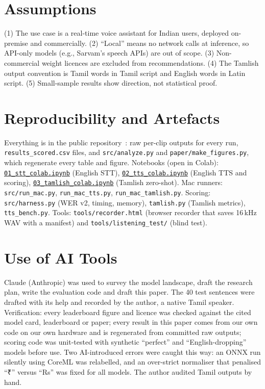\documentclass[conference]{IEEEtran}
\newcommand{\rupee}{{\tamilfont ₹}}
\newcommand{\colab}[1]{\href{https://colab.research.google.com/github/Kiranrossi/local-voice-research/blob/main/notebooks/#1}{\nolinkurl{#1}}}
\begin{document}
\section{Assumptions}
\label{sec:assumptions}
(1) The use case is a real-time voice assistant for Indian users, deployed on-premise and commercially. (2) ``Local'' means no network calls at inference, so API-only models (e.g., Sarvam's speech APIs) are out of scope. (3) Non-commercial weight licences are excluded from recommendations. (4) The Tamlish output convention is Tamil words in Tamil script and English words in Latin script. (5) Small-sample results show direction, not statistical proof.

\section{Reproducibility and Artefacts}
Everything is in the public repository~\cite{repo}: raw per-clip outputs for every run, \texttt{results\_scored.csv} files, and \texttt{src/analyze.py} and \texttt{paper/make\_figures.py}, which regenerate every table and figure. Notebooks (open in Colab): \colab{01_stt_colab.ipynb} (English STT), \colab{02_tts_colab.ipynb} (English TTS and scoring), \colab{03_tamlish_colab.ipynb} (Tamlish zero-shot). Mac runners: \texttt{src/run\_mac.py}, \texttt{run\_mac\_tts.py}, \texttt{run\_mac\_tamlish.py}. Scoring: \texttt{src/harness.py} (WER v2, timing, memory), \texttt{tamlish.py} (Tamlish metrics), \texttt{tts\_bench.py}. Tools: \texttt{tools/recorder.html} (browser recorder that saves 16\,kHz WAV with a manifest) and \texttt{tools/listening\_test/} (blind test).

\section{Use of AI Tools}
Claude (Anthropic) was used to survey the model landscape, draft the research plan, write the evaluation code and draft this paper. The 40 test sentences were drafted with its help and recorded by the author, a native Tamil speaker. Verification: every leaderboard figure and licence was checked against the cited model card, leaderboard or paper; every result in this paper comes from our own code on our own hardware and is regenerated from committed raw outputs; scoring code was unit-tested with synthetic ``perfect'' and ``English-dropping'' models before use. Two AI-introduced errors were caught this way: an ONNX run silently using CoreML was relabelled, and an over-strict normaliser that penalised ``\rupee{}'' versus ``Rs'' was fixed for all models. The author audited Tamil outputs by hand.
\end{document}
